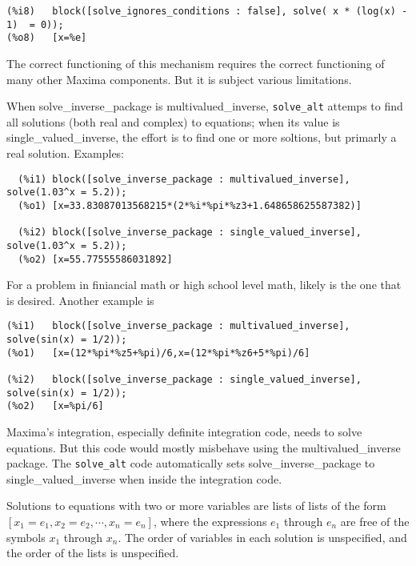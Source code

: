 \documentclass[]{article}%
\newcommand{\altsolve}{\texttt{solve\_alt}}
\begin{document}
\begin{description}
\begin{verbatim}
(%i8)	block([solve_ignores_conditions : false], solve( x * (log(x) - 1)  = 0));
(%o8)	[x=%e]
\end{verbatim}

The correct functioning of this mechanism requires the correct functioning of many other Maxima components. But it is subject various limitations.

\item[solve\_inverse\_package] When solve\_inverse\_package is multivalued\_inverse, \altsolve\/ attemps to find all solutions (both real and complex) to equations; when its value is single\_valued\_inverse, the effort is to find one or more soltions, but primarly a real solution. Examples:
\begin{verbatim}
  (%i1)	block([solve_inverse_package : multivalued_inverse], solve(1.03^x = 5.2));
  (%o1)	[x=33.83087013568215*(2*%i*%pi*%z3+1.648658625587382)]

  (%i2)	block([solve_inverse_package : single_valued_inverse], solve(1.03^x = 5.2));
  (%o2)	[x=55.77555586031892]
\end{verbatim}
For a problem in finiancial math or high school level math, likely is the one that is desired. Another
example is
\begin{verbatim}
(%i1)	block([solve_inverse_package : multivalued_inverse], solve(sin(x) = 1/2));
(%o1)	[x=(12*%pi*%z5+%pi)/6,x=(12*%pi*%z6+5*%pi)/6]

(%i2)	block([solve_inverse_package : single_valued_inverse], solve(sin(x) = 1/2));
(%o2)	[x=%pi/6]
\end{verbatim}

Maxima's integration, especially definite integration code, needs to solve equations. But this code would mostly misbehave using the  multivalued\_inverse package. The \altsolve\/ code automatically sets solve\_inverse\_package to single\_valued\_inverse when inside the integration code.

\end{description}








Solutions to equations with two or more variables are lists of lists of the form \([x_1 = e_1, x_2 = e_2,
\cdots, x_n = e_n] \), where the expressions \(e_1\) through \(e_n\) are free of the symbols \(x_1\)
through \(x_n \). The order of variables in each solution is unspecified, and the order of the lists is
unspecified.
\end{document}
